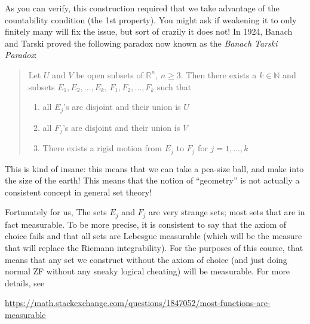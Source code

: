 \documentclass[oneside]{book}
\newcommand{\N}{\mathbb{N}}
\newcommand{\R}{\mathbb{R}}
\begin{document}
As you can verify, this construction required that we take advantage of the countability condition (the 1st property).
You might ask if weakening it to only finitely many will fix the issue, but sort of crazily it does not! In 1924, Banach
and Tarski proved the following paradox now known as the \emph{Banach Tarski Paradox}: 

\begin{quote}
	Let $U$ and $V$ be open subsets of $\R^n$, $n \ge 3$. Then there exists a $k \in \N$ and subsets $E_1, E_2, ...,
	E_k$, $F_1, F_2, ..., F_k$ such that 
	\begin{enumerate}
		\item all $E_j$'s are disjoint and their union is $U$
		\item all $F_j$'s are disjoint and their union is $V$
		\item There exists a rigid motion from $E_j$ to $F_j$ for $j = 1, ..., k$
	\end{enumerate}
\end{quote}

This is kind of insane: this means that we can take a pea-size ball, and make into the size of the earth! This means
that the notion of ``geometry'' is not actually a consistent concept in general set theory! 

Fortunately for us, The sets $E_j$ and $F_j$ are very strange sets; most sets that are in fact measurable. To be more
precise, it is consistent to say that the axiom of choice fails and that all sets are Lebesgue measurable (which will be
the measure that will replace the Riemann integrability). For the purposes of this course, that means that any set
we construct without the axiom of choice (and just doing normal ZF  without any sneaky logical cheating) will be measurable.
For more details, see
\begin{center}
	\url{https://math.stackexchange.com/questions/1847052/most-functions-are-measurable}
\end{center}
	
\end{document}
